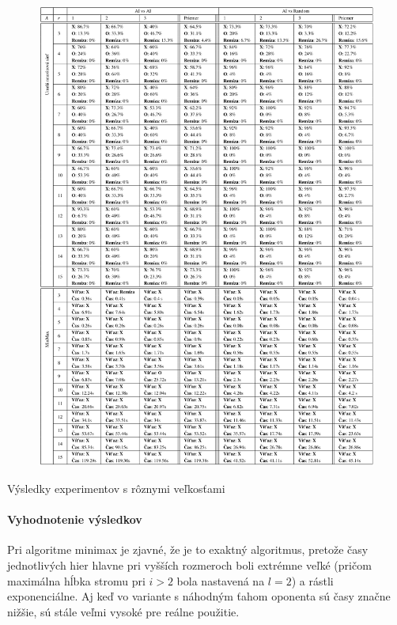 \clearpage
\begin{table}[H]
    \begin{figure}[H]
        \centering
        \includegraphics[width=1\textwidth]{images/table.png}
    \end{figure}
    \caption{Výsledky experimentov s rôznymi veľkosťami}\label{table:experiments-boards}
\end{table}
\clearpage

\paragraph{Vyhodnotenie výsledkov}

Pri algoritme minimax je zjavné, že je to exaktný algoritmus, pretože časy jednotlivých hier hlavne pri vyšších
rozmeroch boli extrémne veľké (pričom maximálna hĺbka stromu pri $i>2$ bola nastavená na $l=2$) a rástli exponenciálne.
Aj keď vo variante s náhodným ťahom oponenta sú časy značne nižšie, sú stále veľmi vysoké pre reálne použitie.

